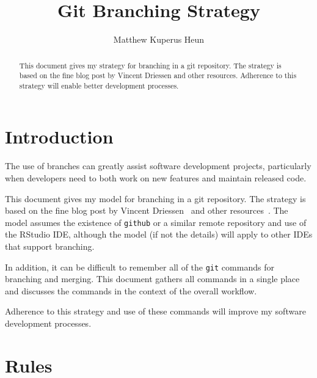 \documentclass{article}
\begin{document}
\title{Git Branching Strategy}
\author{Matthew Kuperus Heun}

\maketitle


\begin{abstract}

This document gives my strategy for branching in a git repository. 
The strategy is based on the fine blog post by Vincent Driessen
and other resources.
Adherence to this strategy will enable better development processes.
\end{abstract}


\section{Introduction} 
\label{sec:introduction}

The use of branches can greatly assist software development projects, 
particularly when developers need to both 
work on new features and maintain released code.

This document gives my model for branching in a git repository. 
The strategy is based on the fine blog post by Vincent Driessen~\cite{Driessen:2010}
and other resources~\cite{Onkelinx:2017, Rankin:2010}.
The model assumes the existence of \texttt{github} or a similar remote repository
and use of the RStudio IDE, 
although the model (if not the details) 
will apply to other IDEs that support branching. 

In addition, it can be difficult to remember 
all of the \texttt{git} commands for branching and merging.
This document gathers all commands in a single place
and discusses the commands in the context of the overall workflow.
 
Adherence to this strategy and use of these commands 
will improve my software development processes.


\section{Rules} 
\label{sec:rules}
\end{document}
